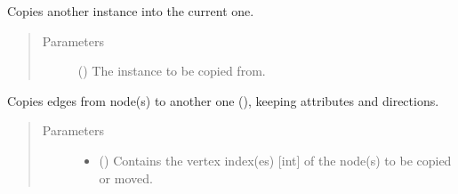 \documentclass[letterpaper,10pt,english]{sphinxmanual}
\begin{document}
\begin{fulllineitems}
\begin{fulllineitems}
\begin{quote}
\begin{description}
\begin{itemize}
\end{itemize}

\end{description}\end{quote}

\end{fulllineitems}


\begin{fulllineitems}
\label{\detokenize{reference:pypath.main.PyPath.consistency}}
\end{fulllineitems}


\begin{fulllineitems}
\label{\detokenize{reference:pypath.main.PyPath.copy}}
Copies another {\hyperref[\detokenize{reference:pypath.main.PyPath}]{}} instance into the
current one.
\begin{quote}\begin{description}
\item[{Parameters}] \leavevmode
{} ({\hyperref[\detokenize{reference:pypath.main.PyPath}]{}}) \textendash{} The instance to be copied from.

\end{description}\end{quote}

\end{fulllineitems}


\begin{fulllineitems}
\label{\detokenize{reference:pypath.main.PyPath.copy_edges}}
Copies edges from  node(s) to another one (),
keeping attributes and directions.
\begin{quote}\begin{description}
\item[{Parameters}] \leavevmode\begin{itemize}
\item {} 
 () \textendash{} Contains the vertex index(es) {[}int{]} of the node(s) to be
copied or moved.


\end{itemize}
\end{description}
\end{quote}
\end{fulllineitems}
\end{fulllineitems}
\end{document}
